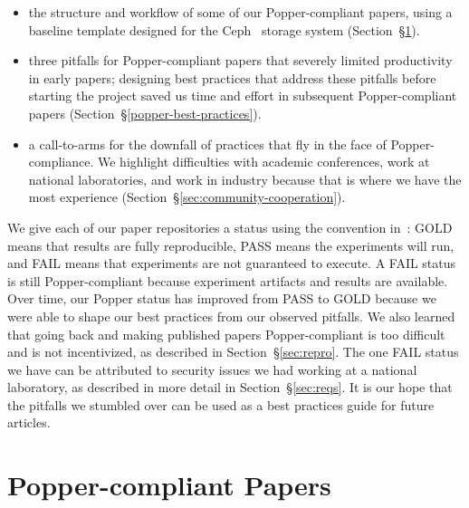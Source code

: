 \begin{itemize}

  \item the structure and workflow of some of our Popper-compliant papers,
using a baseline template designed for the Ceph~\cite{weil:osdi2006-ceph}
storage system (Section~\S\ref{sec:popper-compliant-papers}).

  \item three pitfalls for Popper-compliant papers that severely limited
productivity in early papers; designing best practices that address these
pitfalls before starting the project saved us time and effort in subsequent
Popper-compliant papers (Section~\S\ref{popper-best-practices}).

  \item a call-to-arms for the downfall of practices that fly in the face of
Popper-compliance. We highlight difficulties with academic conferences, work at
national laboratories, and work in industry because that is where we have the
most experience (Section~\S\ref{sec:community-cooperation}).

\end{itemize}

We give each of our paper repositories a status using the convention
in~\cite{jimenez:rr18-popper}: GOLD means that results are fully reproducible,
PASS means the experiments will run, and FAIL means that experiments are not
guaranteed to execute. A FAIL status is still Popper-compliant because
experiment artifacts and results are available.  Over time, our Popper status
has improved from PASS to GOLD because we were able to shape our best practices
from our observed pitfalls. We also learned that going back and making
published papers Popper-compliant is too difficult and is not incentivized, as
described in Section~\S\ref{sec:repro}. The one FAIL status we have can be
attributed to security issues we had working at a national laboratory, as
described in more detail in Section~\S\ref{sec:reqs}. It is our hope that the
pitfalls we stumbled over can be used as a best practices guide for future
articles.

\section{Popper-compliant Papers}
\label{sec:popper-compliant-papers}

